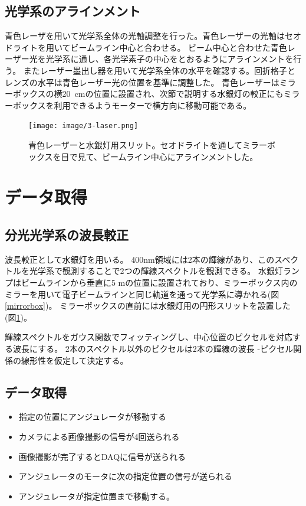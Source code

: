 \documentclass[a4paper,11pt,uplatex]{jsbook}
\begin{document}
\subsection{光学系のアラインメント}
青色レーザを用いて光学系全体の光軸調整を行った。青色レーザーの光軸はセオドライトを用いてビームライン中心と合わせる。
ビーム中心と合わせた青色レーザー光を光学系に通し、各光学素子の中心をとおるようにアラインメントを行う。
またレーザー墨出し器を用いて光学系全体の水平を確認する。回折格子とレンズの水平は青色レーザー光の位置を基準に調整した。
青色レーザーはミラーボックスの横20~cmの位置に設置され、次節で説明する水銀灯の較正にもミラーボックスを利用できるようモーターで横方向に移動可能である。
\begin{figure}
  \centering
  \texttt{[image: image/3-laser.png]}\\
  \caption[青色レーザー]{青色レーザーと水銀灯用スリット。セオドライトを通してミラーボックスを目で見て、ビームライン中心にアラインメントした。}
  \label{laser}
\end{figure}
\section{データ取得}


\subsection{分光光学系の波長較正}
波長較正として水銀灯を用いる。
$400 \text{nm}$領域には2本の輝線があり、このスペクトルを光学系で観測することで2つの輝線スペクトルを観測できる。
水銀灯ランプはビームラインから垂直に5 mの位置に設置されており、ミラーボックス内のミラーを用いて電子ビームラインと同じ軌道を通って光学系に導かれる(図\ref{mirrorbox})。
ミラーボックスの直前には水銀灯用の円形スリットを設置した(図\ref{laser})。

輝線スペクトルをガウス関数でフィッティングし、中心位置のピクセルを対応する波長にする。
2本のスペクトル以外のピクセルは2本の輝線の波長 -ピクセル関係の線形性を仮定して決定する。
\subsection{データ取得}
\begin{itemize}
  \item 指定の位置にアンジュレータが移動する
  \item カメラによる画像撮影の信号が4回送られる
  \item 画像撮影が完了するとDAQに信号が送られる
  \item アンジュレータのモータに次の指定位置の信号が送られる
  \item アンジュレータが指定位置まで移動する。
\end{itemize}
\end{document}
